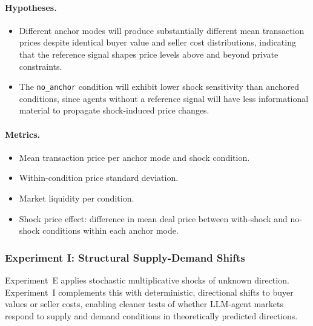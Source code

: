 \paragraph{Hypotheses.}
\begin{itemize}
    \item[\textbf{H-J1.}] Different anchor modes will produce substantially different mean transaction prices despite identical buyer value and seller cost distributions, indicating that the reference signal shapes price levels above and beyond private constraints.
    \item[\textbf{H-J2.}] The \texttt{no\_anchor} condition will exhibit lower shock sensitivity than anchored conditions, since agents without a reference signal will have less informational material to propagate shock-induced price changes.
\end{itemize}

\paragraph{Metrics.}
\begin{itemize}
    \item Mean transaction price per anchor mode and shock condition.
    \item Within-condition price standard deviation.
    \item Market liquidity per condition.
    \item Shock price effect: difference in mean deal price between with-shock and no-shock conditions within each anchor mode.
\end{itemize}

\subsubsection{Experiment I: Structural Supply-Demand Shifts}
\label{sec:exp-supply-demand}

Experiment~E applies stochastic multiplicative shocks of unknown direction.  Experiment~I complements this with deterministic, directional shifts to buyer values or seller costs, enabling cleaner tests of whether LLM-agent markets respond to supply and demand conditions in theoretically predicted directions.

